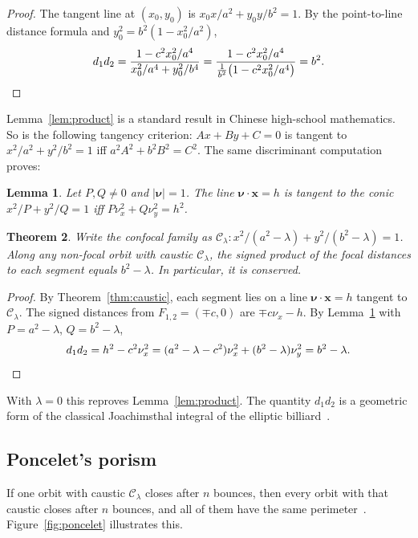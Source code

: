 \documentclass[11pt]{amsart}
\newtheorem{theorem}{Theorem}
\newtheorem{lemma}[theorem]{Lemma}
\theoremstyle{remark}
\begin{document}
\begin{proof}
The tangent line at $(x_0, y_0)$ is $x_0x/a^2 + y_0y/b^2 = 1$. By the
point-to-line distance formula and $y_0^2 = b^2(1 - x_0^2/a^2)$,
\[
  d_1d_2 = \frac{1 - c^2x_0^2/a^4}{x_0^2/a^4 + y_0^2/b^4}
         = \frac{1 - c^2x_0^2/a^4}{\frac{1}{b^2}\bigl(1 - c^2x_0^2/a^4\bigr)} = b^2. \qedhere
\]
\end{proof}

Lemma~\ref{lem:product} is a standard result in Chinese high-school
mathematics. So is the following tangency criterion: $Ax + By + C = 0$ is
tangent to $x^2/a^2 + y^2/b^2 = 1$ iff $a^2A^2 + b^2B^2 = C^2$. The same
discriminant computation proves:

\begin{lemma}\label{lem:tangency}
Let $P, Q \neq 0$ and $|\boldsymbol\nu| = 1$. The line $\boldsymbol\nu\cdot\mathbf x = h$
is tangent to the conic $x^2/P + y^2/Q = 1$ iff $P\nu_x^2 + Q\nu_y^2 = h^2$.
\end{lemma}

\begin{theorem}\label{thm:conserved}
Write the confocal family as $\mathcal C_\lambda: x^2/(a^2-\lambda) +
y^2/(b^2-\lambda) = 1$. Along any non-focal orbit with caustic
$\mathcal C_\lambda$, the signed product of the focal distances to each
segment equals $b^2 - \lambda$. In particular, it is conserved.
\end{theorem}

\begin{proof}
By Theorem~\ref{thm:caustic}, each segment lies on a line
$\boldsymbol\nu\cdot\mathbf x = h$ tangent to $\mathcal C_\lambda$. The signed
distances from $F_{1,2} = (\mp c, 0)$ are $\mp c\nu_x - h$. By
Lemma~\ref{lem:tangency} with $P = a^2 - \lambda$, $Q = b^2 - \lambda$,
\[
  d_1d_2 = h^2 - c^2\nu_x^2 = (a^2 - \lambda - c^2)\nu_x^2 + (b^2 - \lambda)\nu_y^2
         = b^2 - \lambda. \qedhere
\]
\end{proof}

With $\lambda = 0$ this reproves Lemma~\ref{lem:product}. The quantity
$d_1d_2$ is a geometric form of the classical Joachimsthal integral of the
elliptic billiard~\cite{Tabachnikov2005}.

\subsection{Poncelet's porism}

If one orbit with caustic $\mathcal C_\lambda$ closes after $n$ bounces, then
every orbit with that caustic closes after $n$ bounces, and all of them have
the same perimeter~\cite{Poncelet1822, DragovicRadnovic2011, Tabachnikov2005}.
Figure~\ref{fig:poncelet} illustrates this.
\end{document}
